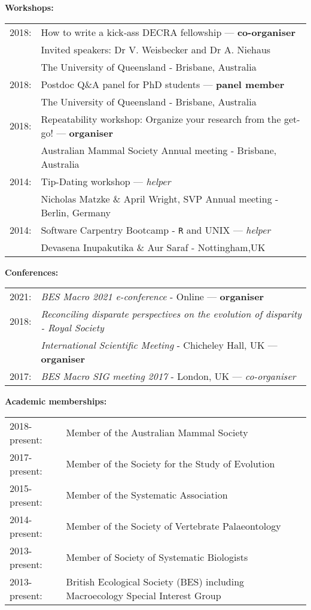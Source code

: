 \documentclass[10pt,a4paper]{article}
\begin{document}
{\bigskip
\raggedright\textbf{Workshops:}

\begin{tabular}{ll}
2018: & How to write a kick‐ass DECRA fellowship --- \textbf{co-organiser}\\
      & Invited speakers: Dr V. Weisbecker and Dr A. Niehaus\\
      & The University of Queensland - Brisbane, Australia\\
2018: & Postdoc Q\&A panel for PhD students --- \textbf{panel member}\\
      & The University of Queensland - Brisbane, Australia\\
2018: & Repeatability workshop: Organize your research from the get-go! --- \textbf{organiser}\\
      & Australian Mammal Society Annual meeting - Brisbane, Australia\\
2014: & Tip-Dating workshop --- \textit{helper}\\
      & Nicholas Matzke \& April Wright, SVP Annual meeting - Berlin, Germany\\
2014: & Software Carpentry Bootcamp - \texttt{R} and UNIX --- \textit{helper}\\
      & Devasena Inupakutika \& Aur Saraf - Nottingham,UK\\
\end{tabular}

\bigskip

\raggedright\textbf{Conferences:}\\
\begin{tabular}{ll}
2021: & \textit{BES Macro 2021 e-conference} - Online --- \textbf{organiser}\\
2018: & \textit{Reconciling disparate perspectives on the evolution of disparity - Royal Society}\\
      & \textit{International Scientific Meeting} - Chicheley Hall, UK --- \textbf{organiser}\\
2017: & \textit{BES Macro SIG meeting 2017} - London, UK --- \textit{co-organiser}\\
\end{tabular}

\bigskip

\raggedright\textbf{Academic memberships:}
\begin{tabular}{ll}
2018-present: & Member of the Australian Mammal Society\\ 
2017-present: & Member of the Society for the Study of Evolution\\ 
2015-present: & Member of the Systematic Association\\ 
2014-present: & Member of the Society of Vertebrate Palaeontology\\
2013-present: & Member of Society of Systematic Biologists\\
2013-present: & British Ecological Society (BES) including Macroecology Special Interest Group\\
\end{tabular}
\bigskip

}
\end{document}
